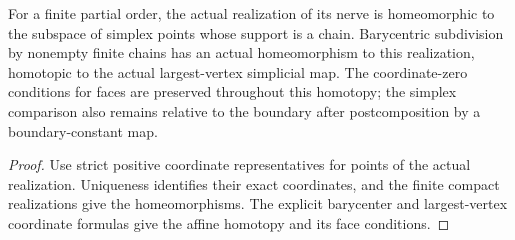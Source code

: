 \begin{proposition}
  \leanok
  For a finite partial order, the actual realization of its nerve is homeomorphic to the subspace of simplex points whose support is a chain. Barycentric subdivision by nonempty finite chains has an actual homeomorphism to this realization, homotopic to the actual largest-vertex simplicial map. The coordinate-zero conditions for faces are preserved throughout this homotopy; the simplex comparison also remains relative to the boundary after postcomposition by a boundary-constant map.
\end{proposition}
\begin{proof}
  Use strict positive coordinate representatives for points of the actual realization. Uniqueness identifies their exact coordinates, and the finite compact realizations give the homeomorphisms. The explicit barycenter and largest-vertex coordinate formulas give the affine homotopy and its face conditions.
  \leanok
\end{proof}

